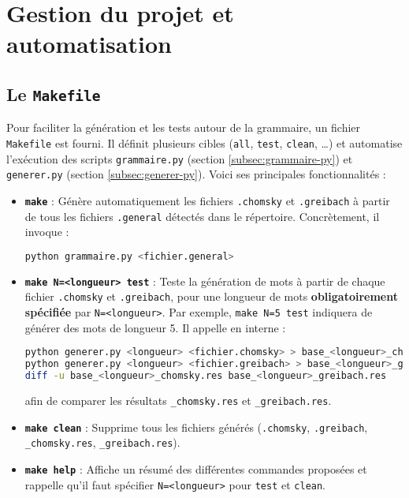 \documentclass[a4paper,12pt]{article}
\begin{document}
\section{Gestion du projet et automatisation}
\label{sec:makefile-req}

\subsection{Le \texttt{Makefile}}
\label{subsec:makefile}

Pour faciliter la génération et les tests autour de la grammaire, un fichier \texttt{Makefile} est fourni. Il définit plusieurs cibles (\texttt{all}, \texttt{test}, \texttt{clean}, \ldots) et automatise l’exécution des scripts \texttt{grammaire.py} (section \ref{subsec:grammaire-py}) et \texttt{generer.py} (section \ref{subsec:generer-py}). Voici ses principales fonctionnalités :

\begin{itemize}
    \item \textbf{\texttt{make}} : Génère automatiquement les fichiers \texttt{.chomsky} et \texttt{.greibach} à partir de tous les fichiers \texttt{.general} détectés dans le répertoire. Concrètement, il invoque :
\begin{lstlisting}[language=bash, caption={Extrait de Makefile pour la cible `all`}, label={lst:make-all}]
python grammaire.py <fichier.general>
\end{lstlisting}

    \item \textbf{\texttt{make N=<longueur> test}} : Teste la génération de mots à partir de chaque fichier \texttt{.chomsky} et \texttt{.greibach}, pour une longueur de mots \textbf{obligatoirement spécifiée} par \texttt{N=<longueur>}.  
    Par exemple, \texttt{make N=5 test} indiquera de générer des mots de longueur 5. Il appelle en interne :
\pagebreak 
\begin{lstlisting}[language=bash, caption={Extrait de Makefile pour la cible `test`}, label={lst:make-test}]
python generer.py <longueur> <fichier.chomsky> > base_<longueur>_chomsky.res
python generer.py <longueur> <fichier.greibach> > base_<longueur>_greibach.res
diff -u base_<longueur>_chomsky.res base_<longueur>_greibach.res
\end{lstlisting}

    afin de comparer les résultats \texttt{\_chomsky.res} et \texttt{\_greibach.res}.

    \item \textbf{\texttt{make clean}} : Supprime tous les fichiers générés (\texttt{.chomsky}, \texttt{.greibach}, \texttt{\_chomsky.res}, \texttt{\_greibach.res}).

    \item \textbf{\texttt{make help}} : Affiche un résumé des différentes commandes proposées et rappelle qu’il faut spécifier \texttt{N=<longueur>} pour \texttt{test} et \texttt{clean}.
\end{itemize}
\end{document}
